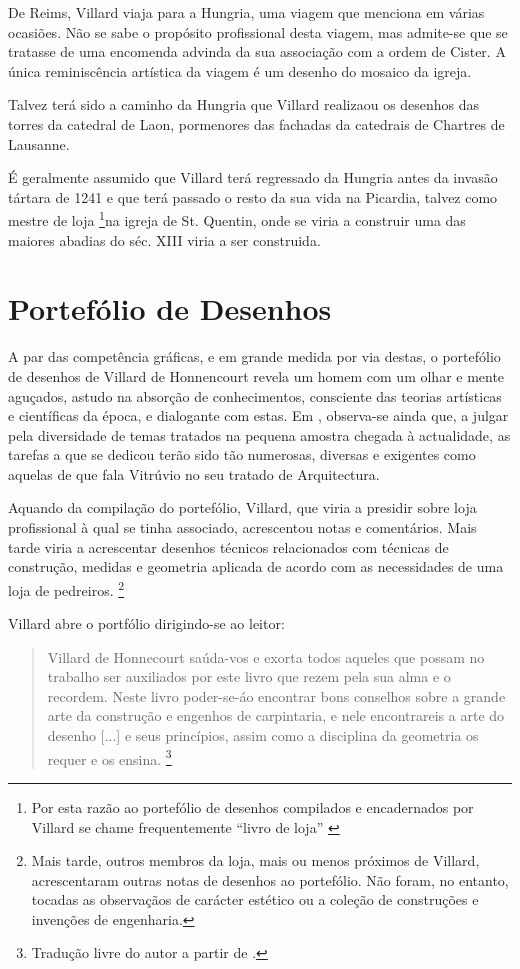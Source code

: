 \documentclass{article}
\begin{document}
De Reims, Villard viaja para a Hungria, uma viagem que menciona em
várias ocasiões. Não se sabe o propósito profissional desta viagem,
mas admite-se que se tratasse de uma encomenda advinda da sua
associação com a ordem de Cister. A única reminiscência artística da
viagem é um desenho do mosaico da igreja.

Talvez terá sido a caminho da Hungria que Villard realizaou os
desenhos das torres da catedral de Laon, pormenores das fachadas da
catedrais de Chartres de Lausanne.

É geralmente assumido \cite{teresa} que Villard terá regressado da
Hungria antes da invasão tártara de 1241 e que terá passado o resto da
sua vida na Picardia, talvez como mestre de loja \footnote{Por esta
  razão ao portefólio de desenhos compilados e encadernados por
  Villard se chame frequentemente ``livro de loja'' \cite{teresa}}na
igreja de St. Quentin, onde se viria a construir uma das maiores
abadias do séc. XIII viria a ser construida.

\section{Portefólio de Desenhos}

A par das competência gráficas, e em grande medida por via destas, o
portefólio de desenhos de Villard de Honnencourt revela um homem com
um olhar e mente aguçados, astudo na absorção de conhecimentos,
consciente das teorias artísticas e científicas da época, e dialogante
com estas. Em \cite{teresa}, observa-se ainda que, a julgar pela
diversidade de temas tratados na pequena amostra chegada à
actualidade, as tarefas a que se dedicou terão sido tão numerosas,
diversas e exigentes como aquelas de que fala Vitrúvio no seu tratado
de Arquitectura.

Aquando da compilação do portefólio, Villard, que viria a presidir
sobre loja profissional à qual se tinha associado, acrescentou notas e
comentários. Mais tarde viria a acrescentar desenhos técnicos
relacionados com técnicas de construção, medidas e geometria aplicada
de acordo com as necessidades de uma loja de pedreiros. \footnote{Mais
  tarde, outros membros da loja, mais ou menos próximos de Villard,
  acrescentaram outras notas de desenhos ao portefólio. Não foram, no
  entanto, tocadas as observaçãos de carácter estético ou a coleção de
  construções e invenções de engenharia.}

Villard abre o portfólio dirigindo-se ao leitor:

\begin{quote} Villard de Honnecourt saúda-vos e exorta todos aqueles
que possam no trabalho ser auxiliados por este livro que rezem pela
sua alma e o recordem. Neste livro poder-se-áo encontrar bons
conselhos sobre a grande arte da construção e engenhos de carpintaria,
e nele encontrareis a arte do desenho [...] e seus princípios, assim
como a disciplina da geometria os requer e os
ensina. \footnote{Tradução livre do autor a partir de \cite{teresa}.}
\end{quote}
\end{document}
